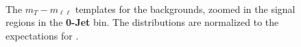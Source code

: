 \begin{figure}[!hbtp]
{}
\\
\caption{The $m_T-m_{\ell\ell}$ templates for the backgrounds, zoomed in 
the signal regions in the {\bf 0-Jet} bin. The distributions are 
normalized to the expectations for \intlumiEightTeV.}
\label{fig:mtvsmll_bkg_0j}
\end{figure}

